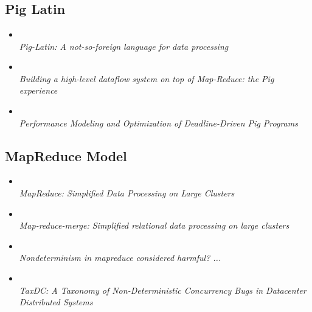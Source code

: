 \section*{}

\subsection{Pig Latin}
\begin{frame}
  \begin{itemize}
    \item \citet[SIGMOD][]{olston2008pig} \\
          \emph{Pig-Latin: A not-so-foreign language for data processing}
    \item \citet[VLDB][]{gates2009building} \\
          \emph{Building a high-level dataflow system on top of Map-Reduce: the
          Pig experience}
    \item \citet[TASS][]{zhang2013performance} \\
          \emph{Performance Modeling and Optimization of Deadline-Driven Pig
          Programs}
  \end{itemize}
\end{frame}

\subsection{MapReduce Model}
\begin{frame}
  \begin{itemize}
    \item \citet[CACM][]{dean2004mapreduce} \\
          \emph{MapReduce: Simplified Data Processing on Large Clusters}
    \item \citet[SIGMOD][]{yang2007map} \\
          \emph{Map-reduce-merge: Simplified relational data processing on large
          clusters}
    \item \citet[ICSE][]{xiao2014nondeterminism} \\
          \emph{Nondeterminism in mapreduce considered harmful? ...}
    \item \citet[ASPLOS][]{leesatapornwongsa2016taxdc} \\
          \emph{TaxDC: A Taxonomy of Non-Deterministic Concurrency Bugs in
          Datacenter Distributed Systems}
  \end{itemize}
\end{frame}

